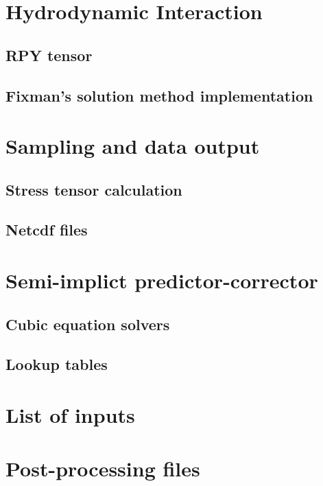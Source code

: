 \documentclass{article}
\begin{document}
\section{Hydrodynamic Interaction}

\subsection{RPY tensor}

\subsection{Fixman's solution method implementation}

\section{Sampling and data output}

\subsection{Stress tensor calculation}

\subsection{Netcdf files}

\section{Semi-implict predictor-corrector}

\subsection{Cubic equation solvers}

\subsection{Lookup tables}

\section{List of inputs}

\section{Post-processing files}

\printbibliography
\end{document}
